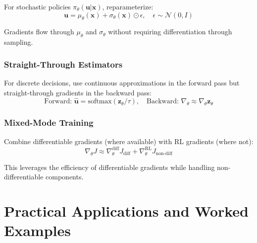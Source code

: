 For stochastic policies $\pi_\theta(\mathbf{u} | \mathbf{x})$, reparameterize:
\begin{equation}
\mathbf{u} = \mu_\theta(\mathbf{x}) + \sigma_\theta(\mathbf{x}) \odot \epsilon, \quad \epsilon \sim \mathcal{N}(0, I)
\end{equation}

Gradients flow through $\mu_\theta$ and $\sigma_\theta$ without requiring differentiation through sampling.

\subsubsection{Straight-Through Estimators}

For discrete decisions, use continuous approximations in the forward pass but straight-through gradients in the backward pass:
\begin{equation}
\text{Forward: } \hat{\mathbf{u}} = \text{softmax}(\mathbf{z}_\theta / \tau), \quad \text{Backward: } \nabla_\theta \approx \nabla_\theta \mathbf{z}_\theta
\end{equation}

\subsubsection{Mixed-Mode Training}

Combine differentiable gradients (where available) with RL gradients (where not):
\begin{equation}
\nabla_\theta J \approx \nabla_\theta^{\text{diff}} J_{\text{diff}} + \nabla_\theta^{\text{RL}} J_{\text{non-diff}}
\end{equation}

This leverages the efficiency of differentiable gradients while handling non-differentiable components.


\section{Practical Applications and Worked Examples}
\label{sec:applications}

